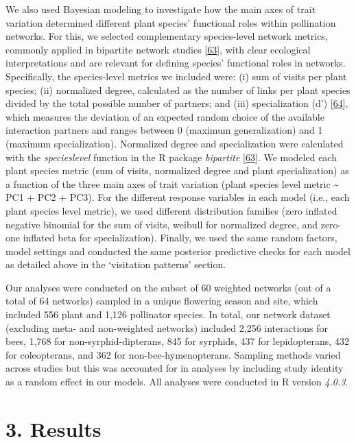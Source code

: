 \documentclass[
  12pt,
  a4paper,
]{article}
\begin{document}
We also used Bayesian modeling to investigate how the main axes of trait variation determined different plant species' functional roles within pollination networks. For this, we selected complementary species-level network metrics, commonly applied in bipartite network studies {[}\protect\hyperlink{ref-dormann2008}{63}{]}, with clear ecological interpretations and are relevant for defining species' functional roles in networks. Specifically, the species-level metrics we included were: (i) sum of visits per plant species; (ii) normalized degree, calculated as the number of links per plant species divided by the total possible number of partners; and (iii) specialization (d') {[}\protect\hyperlink{ref-bluthgen2006}{64}{]}, which measures the deviation of an expected random choice of the available interaction partners and ranges between 0 (maximum generalization) and 1 (maximum specialization). Normalized degree and specialization were calculated with the \emph{specieslevel} function in the R package \emph{bipartite} {[}\protect\hyperlink{ref-dormann2008}{63}{]}. We modeled each plant species metric (sum of visits, normalized degree and plant specialization) as a function of the three main axes of trait variation (plant species level metric \textasciitilde{} PC1 + PC2 + PC3). For the different response variables in each model (i.e., each plant species level metric), we used different distribution families (zero inflated negative binomial for the sum of visits, weibull for normalized degree, and zero-one inflated beta for specialization). Finally, we used the same random factors, model settings and conducted the same posterior predictive checks for each model as detailed above in the `visitation patterns' section.

Our analyses were conducted on the subset of 60 weighted networks (out of a total of 64 networks) sampled in a unique flowering season and site, which included 556 plant and 1,126 pollinator species. In total, our network dataset (excluding meta- and non-weighted networks) included 2,256 interactions for bees, 1,768 for non-syrphid-dipterans, 845 for syrphids, 437 for lepidopterans, 432 for coleopterans, and 362 for non-bee-hymenopterans. Sampling methods varied across studies but this was accounted for in analyses by including study identity as a random effect in our models. All analyses were conducted in R version \emph{4.0.3}.

\hypertarget{results}{%
\section{3. Results}\label{results}}
\end{document}
